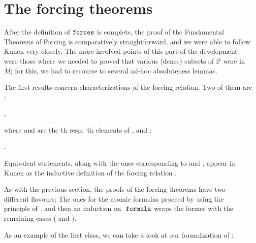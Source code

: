 \section{The forcing theorems}
\label{sec:forcing-theorems}

After the definition of $\mathop{\mathtt{forces}}$ is complete, the proof of the
Fundamental Theorems of Forcing is comparatively straightforward, and
we were able to follow Kunen very closely. The more involved points of
this part of the development were those where we needed to proved that
various (dense) subsets of $\mathbb{P}$ were in $M$; for this, we had to
recourse to several ad-hoc absoluteness lemmas.

The first results concern characterizations of the forcing
relation. Two of them are :
\begin{center}
  ,
\end{center}
where  and  are the
th resp.\ th elements of , and  :
\begin{center}
  .
\end{center}
Equivalent statements, along with the ones corresponding to  and
, appear in Kunen as the
inductive definition of the forcing relation \cite[Def.~IV.2.42]{kunen2011set}.

As with the previous section, the proofs of the forcing theorems have two different
flavours: The ones for the atomic formulas proceed by using the
principle of 
, and then an induction on
$\formula$ wraps the former with the remaining cases ( and ). 

As an example of the first class, we can take a look at our
formalization of \cite[Lem.~IV.2.40(a)]{kunen2011set}:

